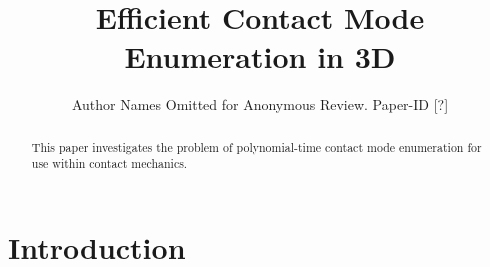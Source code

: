 \documentclass[conference]{IEEEtran}
\begin{document}
\title{\huge Efficient Contact Mode Enumeration in 3D}

\author{Author Names Omitted for Anonymous Review. Paper-ID [?]}



\maketitle

\begin{abstract}
This paper investigates the problem of polynomial-time contact mode enumeration
for use within contact mechanics.
\end{abstract}
 
\IEEEpeerreviewmaketitle

\section{Introduction}
\end{document}
